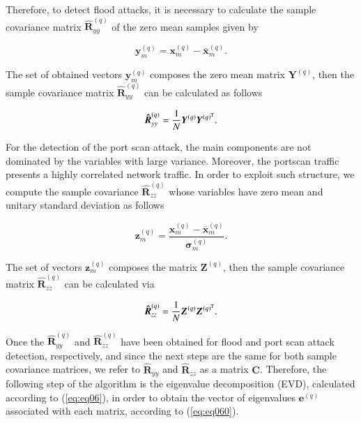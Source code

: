 \documentclass[review]{elsarticle}
\begin{document}
Therefore, to detect flood attacks, it is necessary to calculate the sample covariance matrix $\boldsymbol{\hat{R}}_{yy}^{(q)}$ of the zero mean samples given by

\begin{equation}\label{eq:eq02}
\boldsymbol{y}_{m}^{(q)} = \boldsymbol{x}_{m}^{(q)} - \bar{\boldsymbol{x}}_{m}^{(q)}.
\end{equation}

The set of obtained vectors $\boldsymbol{y}_{m}^{(q)}$ composes the zero mean matrix $\boldsymbol{Y}^{(q)}$, then the sample covariance matrix $\boldsymbol{\hat{R}}_{yy}^{(q)}$ can be calculated as follows

\begin{equation}\label{eq:eq03}
\boldsymbol{\hat{R}}_{yy}^{(q)} = \frac{1}{N}\boldsymbol{Y}^{(q)}\boldsymbol{Y}^{(q)^{\rm T}}.
\end{equation}

For the detection of the port scan attack, the main components are not dominated by the variables with large variance. Moreover, the portscan traffic presents a highly correlated network traffic. In order to exploit such structure, we compute the sample covariance $\boldsymbol{\hat{R}}_{zz}^{(q)}$ whose variables have zero mean and unitary standard deviation as follows

\begin{equation}\label{eq:eq04}
\boldsymbol{z}_{m}^{(q)} = \frac{\boldsymbol{x}_{m}^{(q)} - \bar{\boldsymbol{x}}_{m}^{(q)}}{\boldsymbol{\sigma}_{m}^{(q)}}.
\end{equation}

The set of vectors $\boldsymbol{z}_{m}^{(q)}$ composes the matrix $\boldsymbol{Z}^{(q)}$, then the sample covariance matrix $\boldsymbol{\hat{R}}_{zz}^{(q)}$ can be calculated via 

\begin{equation}\label{eq:eq05}
\boldsymbol{\hat{R}}_{zz}^{(q)} = \frac{1}{N}\boldsymbol{Z}^{(q)}\boldsymbol{Z}^{(q)^{\rm T}}.
\end{equation}

Once the $\boldsymbol{\hat{R}}_{yy}^{(q)}$ and $\boldsymbol{\hat{R}}_{zz}^{(q)}$ have been obtained for flood and port scan attack detection, respectively, and since the next steps are the same for both sample covariance matrices, we refer to $\boldsymbol{\hat{R}}_{yy}$ and $\boldsymbol{\hat{R}}_{zz}$ as a matrix $\boldsymbol{C}$. Therefore, the following step of the algorithm is the eigenvalue decomposition (EVD), calculated according to (\ref{eq:eq06}), in order to obtain the vector of eigenvalues $\boldsymbol{e}^{(q)}$ associated with each matrix, according to (\ref{eq:eq060}).
\end{document}
